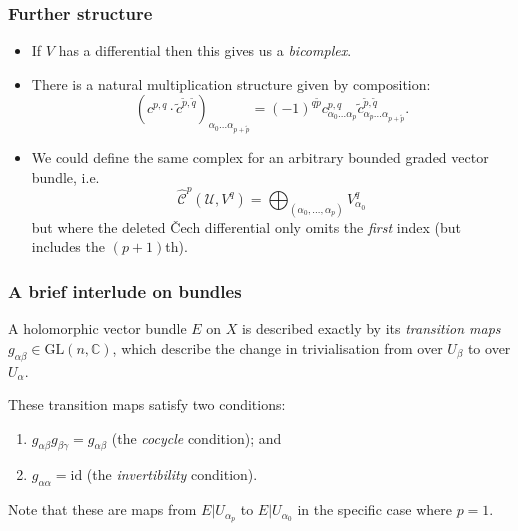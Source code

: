 \documentclass{beamer}
\begin{document}
            \begin{frame}\frametitle{Further structure}
                \begin{itemize}
                    \item If $V$ has a differential then this gives us a \emph{bicomplex}.
                    \pause
                    \item There is a natural multiplication structure given by composition:
                        \begin{equation*}
                            (c^{p,q}\cdot \tilde{c}^{\tilde{p},\tilde{q}})_{\alpha_0\ldots\alpha_{p+\tilde{p}}} = (-1)^{q\tilde{p}} c_{\alpha_0\ldots\alpha_p}^{p,q} \tilde{c}_{\alpha_p\ldots\alpha_{p+\tilde{p}}}^{\tilde{p},\tilde{q}}.
                        \end{equation*}
                    \pause
                    \item We could define the same complex for an arbitrary bounded graded vector bundle, i.e.
                    \begin{equation*}
                        \hat{\mathscr{C}}^p(\mathcal{U},V^q) = \bigoplus_{(\alpha_0,\ldots,\alpha_p)} V_{\alpha_0}^q
                    \end{equation*}
                    but where the deleted Čech differential only omits the \emph{first} index (but includes the $(p+1)$th).
                \end{itemize}
            \end{frame}

            \begin{frame}\frametitle{A brief interlude on bundles}
                A holomorphic vector bundle $E$ on $X$ is described exactly by its \emph{transition maps $g_{\alpha\beta}\in\mathrm{GL}(n,\mathbb{C})$}, which describe the change in trivialisation from over $U_\beta$ to over $U_\alpha$.

                \pause

                These transition maps satisfy two conditions:

                \pause
                
                \begin{enumerate}
                    \item $g_{\alpha\beta}g_{\beta\gamma}=g_{\alpha\beta}$ (the \emph{cocycle} condition); and
                    \pause
                    \item $g_{\alpha\alpha}=\mathrm{id}$ (the \emph{invertibility} condition).
                \end{enumerate}

                \pause

                Note that these are maps from $E|U_{\alpha_p}$ to $E|U_{\alpha_0}$ in the specific case where $p=1$.
            \end{frame}
\end{document}
